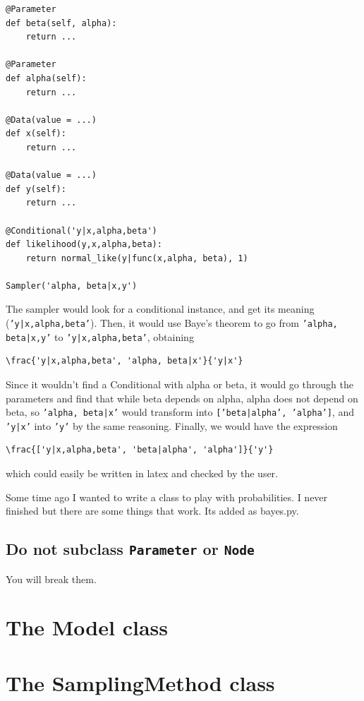 \documentclass[]{book}
\begin{document}
\begin{verbatim}
@Parameter
def beta(self, alpha):
    return ...

@Parameter
def alpha(self):
    return ...

@Data(value = ...)
def x(self):
    return ...

@Data(value = ...)
def y(self):
    return ...

@Conditional('y|x,alpha,beta')
def likelihood(y,x,alpha,beta):
    return normal_like(y|func(x,alpha, beta), 1)

Sampler('alpha, beta|x,y')
\end{verbatim}
The sampler would look for a conditional instance, and get its meaning (\texttt{'y|x,alpha,beta'}). Then, it would use Baye's theorem to go from \texttt{'alpha, beta|x,y'} to \texttt{'y|x,alpha,beta'}, obtaining
\begin{verbatim}\frac{'y|x,alpha,beta', 'alpha, beta|x'}{'y|x'}\end{verbatim}
Since it wouldn't find a Conditional with alpha or beta, it would go through the parameters and find that while beta depends on alpha, alpha does not depend on beta, so \texttt{'alpha, beta|x'} would transform into \texttt{['beta|alpha', 'alpha']}, and \texttt{'y|x'} into \texttt{'y'} by the same reasoning. Finally, we would have the expression
\begin{verbatim}\frac{['y|x,alpha,beta', 'beta|alpha', 'alpha']}{'y'}\end{verbatim} which could easily be written in latex and checked by the user.

Some time ago I wanted to write a class to play with probabilities. I never finished but there are some things that work. Its added as bayes.py. 

\subsection{Do not subclass \texttt{Parameter} or \texttt{Node}}\label{notsubclass} %

You will break them.


\section{The Model class}\label{sec:Model} %


\section{The SamplingMethod class}\label{sec:SamplingMethod} %
\end{document}
